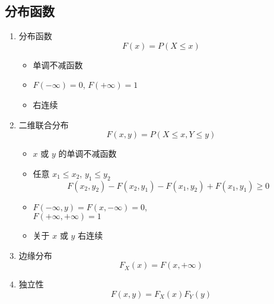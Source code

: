 \documentclass[11pt,a4paper,twocolumn]{article} %
\numberwithin{equation}{section} %
\begin{document}
\subsection{分布函数} %
\label{sub:distribution}
\begin{enumerate}
	\item 分布函数
	\begin{equation}
		F(x) = P(X\le x)
	\end{equation}
	\begin{itemize}
		\item 单调不减函数
		\item $F(-\infty) = 0$, $F(+\infty) = 1$
		\item 右连续
	\end{itemize}
	\item 二维联合分布
	\begin{equation}
		F(x, y) = P(X\le x, Y\le y)
	\end{equation}
	\begin{itemize}
		\item $x$ 或 $y$ 的单调不减函数
		\item 任意 $x_1\le x_2$, $y_1 \le y_2$
		$$
		F(x_2, y_2) - F(x_2, y_1) - F(x_1, y_2) + F(x_1, y_1) \ge 0
		$$
		\item $F(-\infty, y) = F(x, -\infty) = 0$, \\
		$F(+\infty, +\infty) = 1$
		\item 关于 $x$ 或 $y$ 右连续
	\end{itemize}
	\item 边缘分布
	\begin{equation}
		F_X(x) = F(x, +\infty)
	\end{equation}
	\item 独立性
	\begin{equation}
		F(x, y) = F_X(x) F_Y(y)
	\end{equation}
\end{enumerate}
\end{document}
